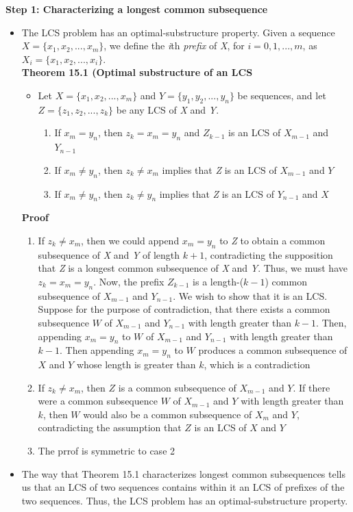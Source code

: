 \documentclass{report}
\begin{document}
\textbf{Step 1: Characterizing a longest common subsequence}
\begin{itemize}
    \item The LCS problem has an optimal-substructure property. Given a sequence $X = \{x_1, x_2, ..., x_m\}$, we define the \textit{i}th \textit{prefix} of \textit{X}, for $i = 0, 1, ..., m$, as $X_i = \{x_1, x_2, ..., x_i\}$. \\
    \textbf{Theorem 15.1 (Optimal substructure of an LCS}
    \begin{itemize}
        \item Let $X = \{x_1, x_2, ..., x_m\}$ and $Y = \{y_1, y_2, ..., y_n\}$ be sequences, and let $Z = \{z_1, z_2, ..., z_k\}$ be any LCS of \textit{X} and \textit{Y}.
        \begin{enumerate}
            \item If $x_m = y_n$, then $z_k = x_m = y_n$ and $Z_{k - 1}$ is an LCS of $X_{m - 1}$ and $Y_{n - 1}$
            \item If $x_m \neq y_n$, then $z_k \neq x_m$ implies that \textit{Z} is an LCS of $X_{m - 1}$ and $Y$
            \item If $x_m \neq y_n$, then $z_k \neq y_n$ implies that \textit{Z} is an LCS of $Y_{n - 1}$ and $X$
        \end{enumerate}
    \end{itemize}
    \textbf{Proof}
    \begin{enumerate}
        \item If $z_k \neq x_m$, then we could append $x_m = y_n$ to \textit{Z} to obtain a common subsequence of \textit{X} and \textit{Y} of length $k + 1$, contradicting the supposition that \textit{Z} is a longest common subsequence of \textit{X} and \textit{Y}. Thus, we must have $z_k = x_m = y_n$. Now, the prefix $Z_{k - 1}$ is a length-($k - 1$) common subsequence of $X_{m - 1}$ and $Y_{n - 1}$. We wish to show that it is an LCS. Suppose for the purpose of contradiction, that there exists a common subsequence $W$ of $X_{m - 1}$ and $Y_{n - 1}$ with length greater than $k - 1$. Then, appending $x_m = y_n$ to $W$ of $X_{m - 1}$ and $Y_{n - 1}$ with length greater than $k - 1$. Then appending $x_m = y_n$ to $W$ produces a common subsequence of $X$ and $Y$ whose length is greater than $k$, which is a contradiction
        \item If $z_k \neq x_m$, then $Z$ is a common subsequence of $X_{m - 1}$ and $Y$. If there were a common subsequence $W$ of $X_{m - 1}$ and $Y$ with length greater than $k$, then $W$ would also be a common subsequence of $X_m$ and $Y$, contradicting the assumption that $Z$ is an LCS of $X$ and $Y$
        \item The prrof is symmetric to case 2
    \end{enumerate}
    \item The way that Theorem 15.1 characterizes longest common subsequences tells us that an LCS of two sequences contains within it an LCS of prefixes of the two sequences. Thus, the LCS problem has an optimal-substructure property.
\end{itemize}
\end{document}
